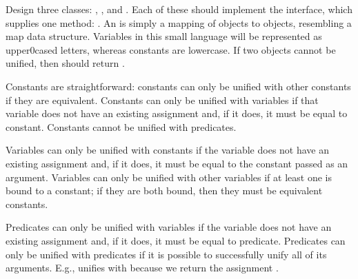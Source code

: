Design three classes: , , and . Each of these should implement the  interface, which supplies one method: . An  is simply a mapping of  objects to  objects, resembling a map data structure. Variables in this small language will be represented as upper0cased letters, whereas constants are lowercase. If two  objects cannot be unified, then  should return .

Constants are straightforward: constants can only be unified with other constants if they are equivalent. Constants can only be unified with variables if that variable does not have an existing assignment and, if it does, it must be equal to  constant. Constants cannot be unified with predicates.

Variables can only be unified with constants if the variable does not have an existing assignment and, if it does, it must be equal to the constant passed as an argument. Variables can only be unified with other variables if at least one is bound to a constant; if they are both bound, then they must be equivalent constants. 

Predicates can only be unified with variables if the variable does not have an existing assignment and, if it does, it must be equal to  predicate. Predicates can only be unified with predicates if it is possible to successfully unify all of its arguments. E.g.,  unifies with  because we return the assignment . 


